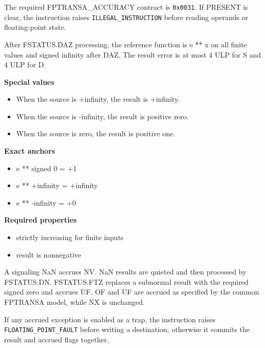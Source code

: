 The required FPTRANSA\_ACCURACY contract is \texttt{0x0031}. If PRESENT is clear, the instruction raises \texttt{ILLEGAL\_INSTRUCTION} before reading operands or floating-point state.

After FSTATUS.DAZ processing, the reference function is e ** x on all finite values and signed infinity after DAZ. The result error is at most 4 ULP for S and 4 ULP for D.

\textbf{Special values}\par
\begin{itemize}
\item When the source is +infinity, the result is +infinity.
\item When the source is -infinity, the result is positive zero.
\item When the source is zero, the result is positive one.
\end{itemize}

\textbf{Exact anchors}\par
\begin{itemize}
\item e ** signed 0 = +1
\item e ** +infinity = +infinity
\item e ** -infinity = +0
\end{itemize}

\textbf{Required properties}\par
\begin{itemize}
\item strictly increasing for finite inputs
\item result is nonnegative
\end{itemize}

A signaling NaN accrues NV. NaN results are quieted and then processed by FSTATUS.DN. FSTATUS.FTZ replaces a subnormal result with the required signed zero and accrues UF. OF and UF are accrued as specified by the common FPTRANSA model, while NX is unchanged.

If any accrued exception is enabled as a trap, the instruction raises \texttt{FLOATING\_POINT\_FAULT} before writing a destination; otherwise it commits the result and accrued flags together.
